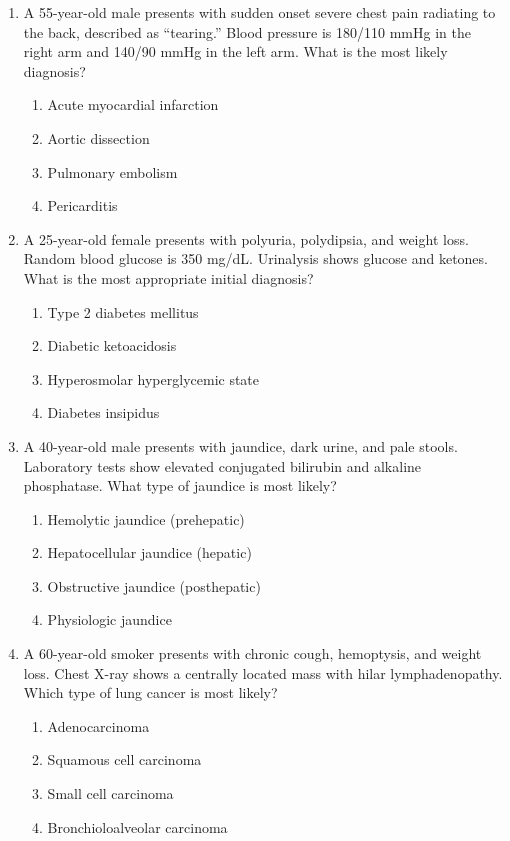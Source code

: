 \documentclass[11pt]{article}
\begin{document}
\begin{enumerate}[label=\textbf{\arabic*.}]

  \item A 55-year-old male presents with sudden onset severe chest pain radiating to the back, 
  described as ``tearing.'' Blood pressure is 180/110 mmHg in the right arm and 140/90 mmHg in the 
  left arm. What is the most likely diagnosis?
  \begin{enumerate}[label=(\Alph*)]
    \item Acute myocardial infarction
    \item Aortic dissection
    \item Pulmonary embolism
    \item Pericarditis
  \end{enumerate}

  \item A 25-year-old female presents with polyuria, polydipsia, and weight loss. Random blood glucose 
  is 350 mg/dL. Urinalysis shows glucose and ketones. What is the most appropriate initial diagnosis?
  \begin{enumerate}[label=(\Alph*)]
    \item Type 2 diabetes mellitus
    \item Diabetic ketoacidosis
    \item Hyperosmolar hyperglycemic state
    \item Diabetes insipidus
  \end{enumerate}

  \item A 40-year-old male presents with jaundice, dark urine, and pale stools. Laboratory tests show 
  elevated conjugated bilirubin and alkaline phosphatase. What type of jaundice is most likely?
  \begin{enumerate}[label=(\Alph*)]
    \item Hemolytic jaundice (prehepatic)
    \item Hepatocellular jaundice (hepatic)
    \item Obstructive jaundice (posthepatic)
    \item Physiologic jaundice
  \end{enumerate}

  \item A 60-year-old smoker presents with chronic cough, hemoptysis, and weight loss. Chest X-ray 
  shows a centrally located mass with hilar lymphadenopathy. Which type of lung cancer is most likely?
  \begin{enumerate}[label=(\Alph*)]
    \item Adenocarcinoma
    \item Squamous cell carcinoma
    \item Small cell carcinoma
    \item Bronchioloalveolar carcinoma
  \end{enumerate}


\end{enumerate}
\end{document}
